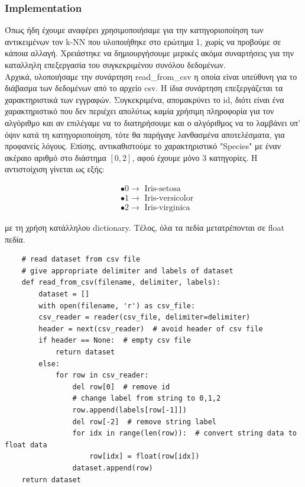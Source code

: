 \documentclass[12pt]{article}
\begin{document}
\subsubsection*{Implementation}

Όπως ήδη έχουμε αναφέρει χρησιμοποιήσαμε για την κατηγοριοποίηση των αντικειμένων τον k-NN που υλοποιήθηκε στο ερώτημα 1, χωρίς να προβούμε σε κάποια αλλαγή. Χρειάστηκε να δημιουργήσουμε μερικές ακόμα συναρτήσεις για την καταλληλη επεξεργασία του συγκεκριμένου συνόλου δεδομένων. \\

Αρχικά, υλοποιήσαμε την συνάρτηση read\_from\_csv η οποία είναι υπεύθυνη για το διάβασμα των δεδομένων από το αρχείο csv. Η ίδια συνάρτηση επεξεργάζεται τα χαρακτηριστικά των εγγραφών. Συγκεκριμένα, απομακρύνει το id, διότι είναι ένα χαρακτηριστικό που δεν περιέχει απολύτως καμία χρήσιμη πληροφορία για τον αλγόριθμο και αν επιλέγαμε να το διατηρήσουμε και ο αλγόριθμος να το λαμβάνει υπ' όψιν κατά τη κατηγοριοποίηση, τότε θα παρήγαγε λανθασμένα αποτελέσματα, για προφανείς λόγους. Επίσης, αντικαθιστούμε το χαρακτηριστικό "Species" με έναν ακέραιο αριθμό στο διάστημα \([0,2]\), αφού έχουμε μόνο 3 κατηγορίες. Η αντιστοίχιση γίνεται ως εξής:

\begin{align*}
	& \bullet 0 \rightarrow \text{ Iris-setosa} \\
	& \bullet 1 \rightarrow \text{ Iris-versicolor} \\
	& \bullet 2 \rightarrow \text{ Iris-virginica}
\end{align*}

με τη χρήση κατάλληλου dictionary. Τέλος, όλα τα πεδία μετατρέπονται σε float πεδία.

\begin{lstlisting}
	# read dataset from csv file
    # give appropriate delimiter and labels of dataset
    def read_from_csv(filename, delimiter, labels):
    	dataset = []
        with open(filename, 'r') as csv_file:
        csv_reader = reader(csv_file, delimiter=delimiter)
        header = next(csv_reader)  # avoid header of csv file
        if header == None:  # empty csv file
        	return dataset
       	else:
        	for row in csv_reader:
          		del row[0]  # remove id
          		# change label from string to 0,1,2
          		row.append(labels[row[-1]])
          		del row[-2]  # remove string label
          		for idx in range(len(row)):  # convert string data to float data
          			row[idx] = float(row[idx])
          		dataset.append(row)
 	return dataset
\end{lstlisting}
\end{document}
